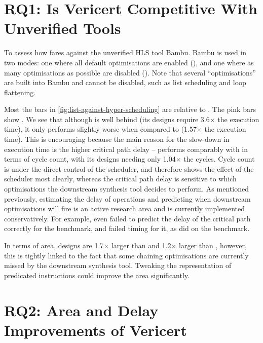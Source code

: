 \section{RQ1: Is Vericert Competitive With Unverified Tools}

To assess how \VericertHyper{} fares against the unverified HLS tool Bambu.
Bambu is used in two modes: one where all default optimisations are enabled
(\BambuDefault{}), and one where as many optimisations as possible are disabled
(\BambuNoOpt{}). Note that several \enquote{optimisations} are built into Bambu
and cannot be disabled, such as list scheduling and loop flattening.

Most the bars in \cref{fig:list-against-hyper-scheduling} are relative to
\BambuDefault. The pink bars show \BambuNoOpt. We see that although
\VericertHyper{} is well behind \BambuDefault{} (its designs require 3.6$\times$
the execution time), it only performs slightly worse when compared to
\BambuNoOpt{} (1.57$\times$ the execution time).  This is encouraging because
the main reason for the slow-down in execution time is the higher critical path
delay -- \VericertHyper{} performs comparably with \BambuNoOpt{} in terms of
cycle count, with its designs needing only 1.04$\times$ the cycles.  Cycle count
is under the direct control of the scheduler, and therefore shows the effect of
the scheduler most clearly, whereas the critical path delay is sensitive to
which optimisations the downstream synthesis tool decides to perform.  As
mentioned previously, estimating the delay of operations and predicting when
downstream optimisations will fire is an active research area and is currently
implemented conservatively.  For example, even \BambuNoOpt{} failed to predict
the delay of the critical path correctly for the  benchmark,
and failed timing for it, as did \VericertList{} on the 
benchmark.

In terms of area, \VericertHyper{} designs are 1.7$\times$ larger than
\BambuDefault{} and 1.2$\times$ larger than \BambuNoOpt{}, however, this is
tightly linked to the fact that some chaining optimisations are currently missed
by the downstream synthesis tool.  Tweaking the representation of predicated
instructions could improve the area significantly.

\section{RQ2: Area and Delay Improvements of Vericert}


